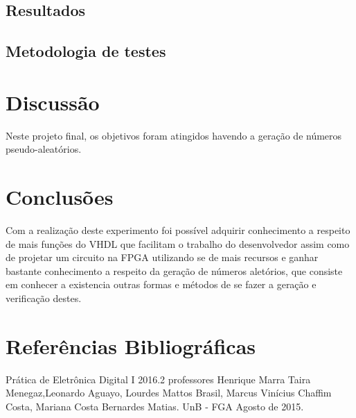 \documentclass[12pts]{article}
\begin{document}
\newpage

\subsection{Resultados}

\subsection{Metodologia de testes}


\section{Discussão}
\iffalse
Discussão sobre os resultados encontrados, comentando detalhadamente as medições realizadas e dando a devida interpretação destas, informando se os objetivos da experimento foram alcançados. Esta é uma das partes mais importantes do relatório: aqui, há oportunidade para expressar os conhecimentos adquiridos na prática e fazer a interrelação com os fundamentos teóricos.
\fi

        Neste projeto final, os objetivos foram atingidos havendo a geração de números pseudo-aleatórios. 

\section{Conclusões}
\iffalse
Conclusões, mostrando os êxitos e eventuais problemas encontrados na realização do experimento, indicando as limitações, apresentando recomendações e/ou sugestões.
\fi

Com a realização deste experimento foi possível adquirir conhecimento a respeito de mais funções do VHDL que facilitam o trabalho do desenvolvedor assim como de projetar um circuito na FPGA utilizando se de mais recursos e ganhar bastante conhecimento a respeito da geração de números aletórios, que consiste em conhecer a existencia outras formas e métodos de se fazer a geração e verificação destes. 

\section{Referências Bibliográficas}
\iffalse
Referencias Bibliográficas, relacionadas e citadas de acordo com as normas da ABNT.
\fi
Prática de Eletrônica Digital I 2016.2 professores Henrique Marra Taira Menegaz,Leonardo Aguayo, Lourdes Mattos Brasil, Marcus Vinícius Chaffim Costa, Mariana Costa Bernardes Matias. UnB - FGA Agosto de 2015.

\iffalse
\section{Diagramas Esquemáticos}
Diagramas Esquemáticos. Todos os diagramas devem ser inseridos ao final do relatório em páginas separadas do texto, indicando a identificação do circuito, autor, revisor, versão e datas relevantes.
\fi
\newpage
\end{document}
